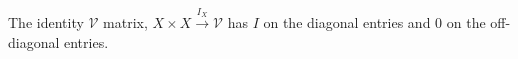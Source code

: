 The identity $\mathcal{V}$ matrix, $X \times X \xrightarrow{I_X} \mathcal{V}$ has $I$ on the diagonal entries and $0$ on the off-diagonal entries.
